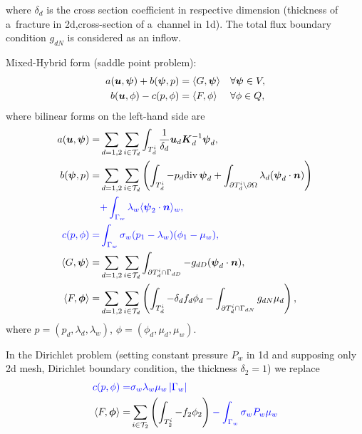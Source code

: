where $\delta_d$ is the cross section coefficient in respective dimension (thickness
of a~fracture in 2d,cross-section of a~channel in 1d). The total flux boundary condition $g_{dN}$ is considered as an inflow.


  Mixed-Hybrid form (saddle point problem): 
\begin{align}
        \label{Saddle1}
 a(\mathbf{\boldsymbol{u}},\mathbf{\boldsymbol{\psi}}) + b(\mathbf{\boldsymbol{\psi}}, p) &= \langle G, \mathbf{\boldsymbol{\psi}}\rangle &&\forall 
\mathbf{\boldsymbol{\psi}}\in V,\\
        \label{Saddle2}
 b(\mathbf{\boldsymbol{u}}, \phi) - c(p,\phi) &= \langle F, \phi \rangle &&\forall \phi \in Q,
\end{align}
where bilinear forms on the left-hand side are
\begin{align*}
 a(\vc u, \vc \psi)=&\sum_{d=1,2}\sum_{i\in \mathcal T_d} \int_{T_d^i}
   \frac{1}{\delta_d} \vc u_d \vc K_d^{-1} \vc \psi_d,\\
%
 b(\vc \psi, p)=&\sum_{d=1,2}\sum_{i\in \mathcal T_d} 
        \left(
        \int_{T_d^i} -p_d\div\,\vc \psi_d
        +\int_{\prtl T_d^i\setminus \prtl\Omega}
                 \lambda_d (\vc \psi_d \cdot \vc n)
        \right) \\
        &\color{blue}{
            + \int_{\Gamma_w} \lambda_w \avg{\vc \psi_2 \cdot \vc n}_w},\\
%
\color{blue}
 c(p,\phi) =& \color{blue}
          \int_{\Gamma_w}
               \sigma_w(p_{1}-\lambda_w)(\phi_{1}-\mu_w),\\
 \langle G, \vc \psi\rangle =& \sum_{d=1,2}\sum_{i\in \mathcal T_d}
        \int_{\prtl T_d^i\cap \Gamma_{dD}}
                 - g_{dD} (\vc \psi_d \cdot \vc n),\\
 \langle F, \vc \phi\rangle =& \sum_{d=1,2}\sum_{i\in \mathcal T_d}\left(
        \int_{T_d^i} - \delta_d f_d \phi_d
        - %
        \int_{\prtl T_d^i\cap \Gamma_{dN}}
                 g_{dN} \mu_d\right),
\end{align*}
where $p=(p_d,\lambda_d, \lambda_w)$, $\phi=(\phi_d,\mu_d, \mu_w)$.

In the Dirichlet problem (setting constant pressure $P_w$ in 1d and supposing only 2d mesh, Dirichlet boundary condition, the thickness $\delta_2=1$) we replace
\begin{align*}
\color{blue}
c(p,\phi) =& \color{blue} \sigma_w\lambda_w\mu_w\left|\Gamma_w\right| \\
\langle F, \mathbf{\boldsymbol{\phi}}\rangle =& \sum_{i\in \mathcal T_2}
        \left(\int_{T_2^i} - f_2 \phi_2\right) \color{blue} -{\int_{\Gamma_w}\sigma_w P_w \mu_w}
\end{align*}


